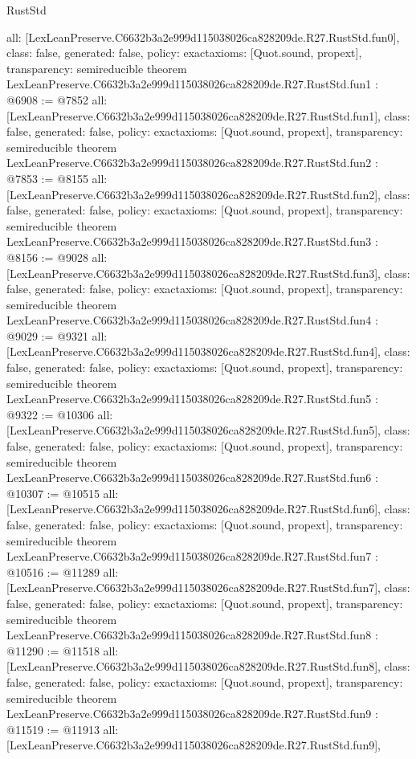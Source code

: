 \begin{lexlean}{RustStd}
\begin{coremodule}
{  all: [LexLeanPreserve.C6632b3a2e999d115038026ca828209de.R27.RustStd.fun0],
  class: false,
  generated: false,
  policy: exact{axioms: [Quot.sound, propext]},
  transparency: semireducible
}
theorem LexLeanPreserve.C6632b3a2e999d115038026ca828209de.R27.RustStd.fun1 : @6908 := @7852 {
  all: [LexLeanPreserve.C6632b3a2e999d115038026ca828209de.R27.RustStd.fun1],
  class: false,
  generated: false,
  policy: exact{axioms: [Quot.sound, propext]},
  transparency: semireducible
}
theorem LexLeanPreserve.C6632b3a2e999d115038026ca828209de.R27.RustStd.fun2 : @7853 := @8155 {
  all: [LexLeanPreserve.C6632b3a2e999d115038026ca828209de.R27.RustStd.fun2],
  class: false,
  generated: false,
  policy: exact{axioms: [Quot.sound, propext]},
  transparency: semireducible
}
theorem LexLeanPreserve.C6632b3a2e999d115038026ca828209de.R27.RustStd.fun3 : @8156 := @9028 {
  all: [LexLeanPreserve.C6632b3a2e999d115038026ca828209de.R27.RustStd.fun3],
  class: false,
  generated: false,
  policy: exact{axioms: [Quot.sound, propext]},
  transparency: semireducible
}
theorem LexLeanPreserve.C6632b3a2e999d115038026ca828209de.R27.RustStd.fun4 : @9029 := @9321 {
  all: [LexLeanPreserve.C6632b3a2e999d115038026ca828209de.R27.RustStd.fun4],
  class: false,
  generated: false,
  policy: exact{axioms: [Quot.sound, propext]},
  transparency: semireducible
}
theorem LexLeanPreserve.C6632b3a2e999d115038026ca828209de.R27.RustStd.fun5 : @9322 := @10306 {
  all: [LexLeanPreserve.C6632b3a2e999d115038026ca828209de.R27.RustStd.fun5],
  class: false,
  generated: false,
  policy: exact{axioms: [Quot.sound, propext]},
  transparency: semireducible
}
theorem LexLeanPreserve.C6632b3a2e999d115038026ca828209de.R27.RustStd.fun6 : @10307 := @10515 {
  all: [LexLeanPreserve.C6632b3a2e999d115038026ca828209de.R27.RustStd.fun6],
  class: false,
  generated: false,
  policy: exact{axioms: [Quot.sound, propext]},
  transparency: semireducible
}
theorem LexLeanPreserve.C6632b3a2e999d115038026ca828209de.R27.RustStd.fun7 : @10516 := @11289 {
  all: [LexLeanPreserve.C6632b3a2e999d115038026ca828209de.R27.RustStd.fun7],
  class: false,
  generated: false,
  policy: exact{axioms: [Quot.sound, propext]},
  transparency: semireducible
}
theorem LexLeanPreserve.C6632b3a2e999d115038026ca828209de.R27.RustStd.fun8 : @11290 := @11518 {
  all: [LexLeanPreserve.C6632b3a2e999d115038026ca828209de.R27.RustStd.fun8],
  class: false,
  generated: false,
  policy: exact{axioms: [Quot.sound, propext]},
  transparency: semireducible
}
theorem LexLeanPreserve.C6632b3a2e999d115038026ca828209de.R27.RustStd.fun9 : @11519 := @11913 {
  all: [LexLeanPreserve.C6632b3a2e999d115038026ca828209de.R27.RustStd.fun9],
}
\end{coremodule}
\end{lexlean}

